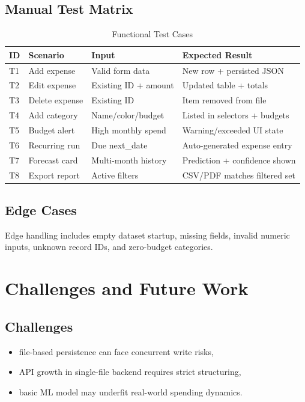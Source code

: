 \documentclass[conference]{IEEEtran}
\begin{document}
\subsection{Manual Test Matrix}
\begin{table}[H]
\caption{Functional Test Cases}
\label{tab:tests}
\centering
\begin{tabular}{|m{0.9cm}|m{3.2cm}|m{2.4cm}|m{3.2cm}|}
\hline
\textbf{ID} & \textbf{Scenario} & \textbf{Input} & \textbf{Expected Result} \\
\hline
T1 & Add expense & Valid form data & New row + persisted JSON \\
\hline
T2 & Edit expense & Existing ID + amount & Updated table + totals \\
\hline
T3 & Delete expense & Existing ID & Item removed from file \\
\hline
T4 & Add category & Name/color/budget & Listed in selectors + budgets \\
\hline
T5 & Budget alert & High monthly spend & Warning/exceeded UI state \\
\hline
T6 & Recurring run & Due next\_date & Auto-generated expense entry \\
\hline
T7 & Forecast card & Multi-month history & Prediction + confidence shown \\
\hline
T8 & Export report & Active filters & CSV/PDF matches filtered set \\
\hline
\end{tabular}
\end{table}

\subsection{Edge Cases}
Edge handling includes empty dataset startup, missing fields, invalid numeric inputs, unknown record IDs, and zero-budget categories.

\section{Challenges and Future Work}
\subsection{Challenges}
\begin{itemize}
    \item file-based persistence can face concurrent write risks,
    \item API growth in single-file backend requires strict structuring,
    \item basic ML model may underfit real-world spending dynamics.
\end{itemize}
\end{document}
